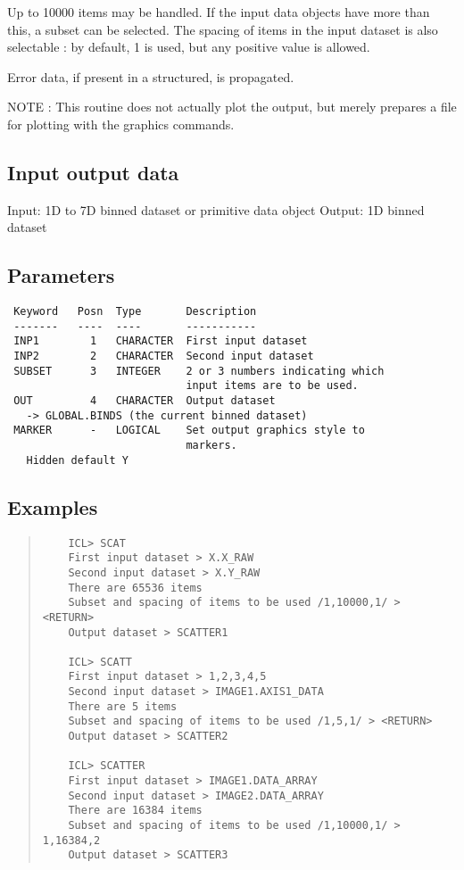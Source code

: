 \documentclass{book}
\renewcommand{\_}{{\tt\char'137}}     %
\begin{document}
Up to 10000 items may be handled. If the input data objects
have more than this, a subset can be selected. The spacing
of items in the input dataset is also selectable : by
default, 1 is used, but any positive value is allowed.

Error data, if present in a structured, is propagated.

NOTE : This routine does not actually plot the output,
but merely prepares a file for plotting with the
graphics commands.
\subsection{Input output data}
Input: 1D to 7D binned dataset or primitive data object
Output: 1D binned dataset
\subsection{Parameters}
\begin{verbatim}
 Keyword   Posn  Type       Description
 -------   ----  ----       -----------
 INP1        1   CHARACTER  First input dataset
 INP2        2   CHARACTER  Second input dataset
 SUBSET      3   INTEGER    2 or 3 numbers indicating which
                            input items are to be used.
 OUT         4   CHARACTER  Output dataset
   -> GLOBAL.BINDS (the current binned dataset)
 MARKER      -   LOGICAL    Set output graphics style to
                            markers.
   Hidden default Y

\end{verbatim}\subsection{Examples}
\begin{quote}\begin{verbatim}
    ICL> SCAT
    First input dataset > X.X_RAW
    Second input dataset > X.Y_RAW
    There are 65536 items
    Subset and spacing of items to be used /1,10000,1/ > <RETURN>
    Output dataset > SCATTER1

    ICL> SCATT
    First input dataset > 1,2,3,4,5
    Second input dataset > IMAGE1.AXIS1_DATA
    There are 5 items
    Subset and spacing of items to be used /1,5,1/ > <RETURN>
    Output dataset > SCATTER2

    ICL> SCATTER
    First input dataset > IMAGE1.DATA_ARRAY
    Second input dataset > IMAGE2.DATA_ARRAY
    There are 16384 items
    Subset and spacing of items to be used /1,10000,1/ > 1,16384,2
    Output dataset > SCATTER3
\end{verbatim}\end{quote}
\end{document}
